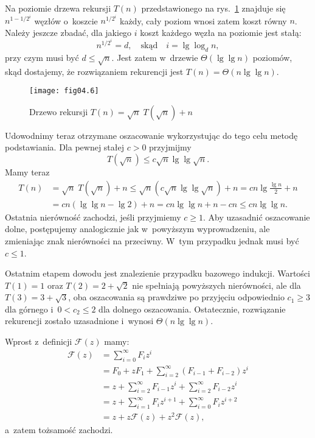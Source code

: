 \subproblem %
Na  poziomie drzewa rekursji $T(n)$ przedstawionego na rys.~\ref{fig:4-4j} znajduje się $n^{1-1/2^i}$ węzłów o~koszcie $n^{1/2^i}$ każdy, cały poziom wnosi zatem koszt równy $n$. Należy jeszcze zbadać, dla jakiego $i$ koszt każdego węzła na  poziomie jest stałą:
\[
	n^{1/2^i} = d, \quad\text{skąd}\quad i = \lg\log_dn,
\]
przy czym musi być $d\le\sqrt{n}$. Jest zatem w~drzewie $\Theta(\lg\lg n)$ poziomów, skąd dostajemy, że rozwiązaniem rekurencji jest $T(n)=\Theta(n\lg\lg n)$.
\begin{figure}[ht]
	\begin{center}
		\texttt{[image: fig04.6]}
	\caption{Drzewo rekursji $T(n)=\sqrt{n}\;T(\!\sqrt{n})+n$} \label{fig:4-4j}
	\end{center}
\end{figure}

Udowodnimy teraz otrzymane oszacowanie wykorzystując do tego celu metodę podstawiania. Dla pewnej stałej $c>0$ przyjmijmy
\[
    T(\!\sqrt{n}) \le c\sqrt{n}\lg\lg\sqrt{n}.
\]
Mamy teraz
\begin{align*}
    T(n) &= \sqrt{n}\;T(\!\sqrt{n})+n \le \sqrt{n}\left(c\sqrt{n}\lg\lg\sqrt{n}\right)+n = cn\lg\frac{\lg n}{2}+n \\[1mm]
	&= cn(\lg\lg n-\lg2)+n = cn\lg\lg n+n-cn \le cn\lg\lg n.
\end{align*}
Ostatnia nierówność zachodzi, jeśli przyjmiemy $c\ge1$. Aby uzasadnić oszacowanie dolne, postępujemy analogicznie jak w~powyższym wyprowadzeniu, ale zmieniając znak nierówności na przeciwny. W~tym przypadku jednak musi być $c\le1$.

Ostatnim etapem dowodu jest znalezienie przypadku bazowego indukcji. Wartości $T(1)=1$ oraz $T(2)=2+\sqrt{2}$ nie spełniają powyższych nierówności, ale dla $T(3)=3+\sqrt{3}$, oba oszacowania są prawdziwe po przyjęciu odpowiednio $c_1\ge3$ dla górnego i~$0<c_2\le2$ dla dolnego oszacowania. Ostatecznie, rozwiązanie rekurencji zostało uzasadnione i~wynosi $\Theta(n\lg\lg n)$.


\subproblem %
Wprost z~definicji $\mathcal{F}(z)$ mamy:
\begin{align*}
	\mathcal{F}(z) &= \sum_{i=0}^\infty F_iz^i \\
	&= F_0+zF_1+\sum_{i=2}^\infty (F_{i-1}+F_{i-2})z^i \\
	&= z+\sum_{i=2}^\infty F_{i-1}z^i+\sum_{i=2}^\infty F_{i-2}z^i \\
	&= z+\sum_{i=1}^\infty F_iz^{i+1}+\sum_{i=0}^\infty F_iz^{i+2} \\[2mm]
	&= z+z\mathcal{F}(z)+z^2\mathcal{F}(z),
\end{align*}
a~zatem tożsamość zachodzi.

